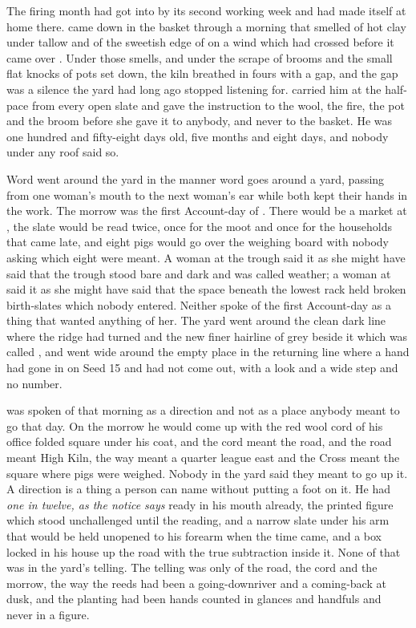 
The firing month had got into  by its second working week and had made itself at home there.  came down in the basket through a morning that smelled of hot clay under tallow and of the sweetish edge of  on a wind which had crossed  before it came over . Under those smells, and under the scrape of brooms and the small flat knocks of pots set down, the kiln breathed in fours with a gap, and the gap was a silence the yard had long ago stopped listening for.  carried him at the half-pace from every open slate and gave the instruction to the wool, the fire, the pot and the broom before she gave it to anybody, and never to the basket. He was one hundred and fifty-eight days old, five months and eight days, and nobody under any roof said so.

Word went around the yard in the manner word goes around a yard, passing from one woman's mouth to the next woman's ear while both kept their hands in the work. The morrow was the first Account-day of . There would be a market at , the slate would be read twice, once for the moot and once for the households that came late, and eight pigs would go over the weighing board with nobody asking which eight were meant. A woman at the trough said it as she might have said that the trough stood bare and dark and was called weather; a woman at  said it as she might have said that the space beneath the lowest rack held broken birth-slates which nobody entered. Neither spoke of the first Account-day as a thing that wanted anything of her. The yard went around the clean dark line where the  ridge had turned and the new finer hairline of grey beside it which was called , and went wide around the empty place in the returning line where a hand had gone in on Seed 15 and had not come out, with a look and a wide step and no number.

 was spoken of that morning as a direction and not as a place anybody meant to go that day. On the morrow he would come up  with the red wool cord of his office folded square under his coat, and the cord meant the road, and the road meant High Kiln, the way  meant a quarter league east and the Cross meant the square where pigs were weighed. Nobody in the yard said they meant to go up it. A direction is a thing a person can name without putting a foot on it. He had \emph{one in twelve, as the notice says} ready in his mouth already, the printed figure which stood unchallenged until the reading, and a narrow slate under his arm that would be held unopened to his forearm when the time came, and a box locked in his house up the road with the true subtraction inside it. None of that was in the yard's telling. The telling was only of the road, the cord and the morrow, the way the reeds had been a going-downriver and a coming-back at dusk, and the planting had been hands counted in glances and handfuls and never in a figure.


